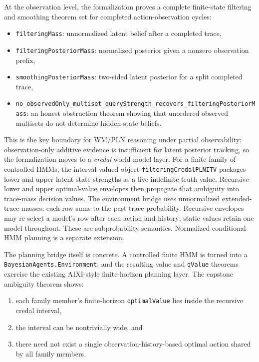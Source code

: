 \documentclass[11pt,a4paper]{article}
\theoremstyle{definition}
\begin{document}
At the observation level, the formalization proves a complete finite-state
filtering and smoothing theorem set for completed action-observation cycles:
\begin{itemize}
\item \texttt{filteringMass}: unnormalized latent belief after a completed trace,
\item \texttt{filteringPosteriorMass}: normalized posterior given a nonzero
  observation prefix,
\item \texttt{smoothingPosteriorMass}: two-sided latent posterior for a split
  completed trace,
\item \texttt{no\_observedOnly\_multiset\_queryStrength\_recovers\_filteringPosteriorMass}:
  an honest obstruction theorem showing that unordered observed multisets do not
  determine hidden-state beliefs.
\end{itemize}

This is the key boundary for WM/PLN reasoning under partial observability:
observation-only additive evidence is insufficient for latent posterior
tracking, so the formalization moves to a \emph{credal} world-model layer.
For a finite family of controlled HMMs, the interval-valued object
\texttt{filteringCredalPLNITV} packages lower and upper latent-state strengths
as a live indefinite truth value.  Recursive lower and upper optimal-value
envelopes then propagate that ambiguity into trace-mass decision values.
The environment bridge uses unnormalized extended-trace masses: each row sums
to the past trace probability. Recursive envelopes may re-select a model's row
after each action and history; static values retain one model throughout.
These are subprobability semantics. Normalized conditional HMM planning is a
separate extension.

The planning bridge itself is concrete.  A controlled finite HMM is turned into
a \texttt{BayesianAgents.Environment}, and the resulting value and
\texttt{qValue} theorems exercise the existing AIXI-style finite-horizon
planning layer.  The capstone ambiguity theorem shows:
\begin{enumerate}
\item each family member's finite-horizon \texttt{optimalValue} lies inside the
  recursive credal interval,
\item the interval can be nontrivially wide, and
\item there need not exist a single observation-history-based optimal action
  shared by all family members.
\end{enumerate}
\end{document}
